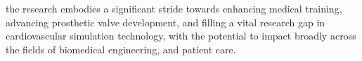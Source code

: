  the research embodies a significant stride towards enhancing medical training, advancing prosthetic valve development, and filling a vital research gap in cardiovascular simulation technology, with the potential to impact broadly across the fields of biomedical engineering, and patient care.






